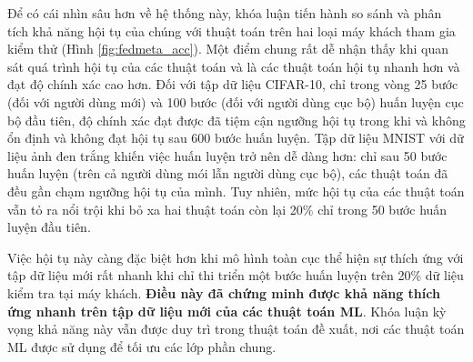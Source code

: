 Để có cái nhìn sâu hơn về hệ thống này, khóa luận tiến hành so sánh và phân tích khả năng hội tụ của chúng với thuật toán  trên hai loại máy khách tham gia kiểm thử (Hình \ref{fig:fedmeta_acc}). Một điểm chung rất dễ nhận thấy khi quan sát quá trình hội tụ của các thuật toán  và  là các thuật toán  hội tụ nhanh hơn và đạt độ chính xác cao hơn. Đối với tập dữ liệu CIFAR-10, chỉ trong vòng 25 bước (đối với người dùng mới) và 100 bước (đối với người dùng cục bộ) huấn luyện cục bộ đầu tiên, độ chính xác đạt được đã tiệm cận ngưỡng hội tụ trong khi  và  không ổn định và không đạt hội tụ sau 600 bước huấn luyện. Tập dữ liệu MNIST với dữ liệu ảnh đen trắng khiến việc huấn luyện trở nên dễ dàng hơn: chỉ sau 50 bước huấn luyện (trên cả người dùng mói lẫn người dùng cục bộ), các thuật toán đã đều gần chạm ngưỡng hội tụ của mình. Tuy nhiên, mức hội tụ của các thuật toán  vẫn tỏ ra nổi trội khi bỏ xa hai thuật toán còn lại 20\% chỉ trong 50 bước huấn luyện đầu tiên.

Việc hội tụ này càng đặc biệt hơn khi mô hình toàn cục thể hiện sự thích ứng với tập dữ liệu mới rất nhanh khi chỉ thi triển một bước huấn luyện trên 20\% dữ liệu kiểm tra tại máy khách. \textbf{Điều này đã chứng minh được khả năng thích ứng nhanh trên tập dữ liệu mới của các thuật toán ML}. Khóa luận kỳ vọng khả năng này vẫn được duy trì trong thuật toán đề xuất, nơi các thuật toán ML được sử dụng để tối ưu các lớp phần chung.

\begin{table}[H]
    \centering
    \caption{Bảng độ chính xác (\%) của thuật toán FedAvg và các thuật toán FedMeta tính trên máy khách (dữ liệu Non-IID)}
    \label{tab:fedmeta_client_acc}
\end{table}

